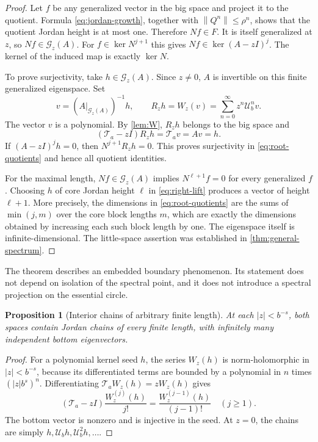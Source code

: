 \documentclass[11pt,a4paper]{article}
\numberwithin{equation}{section}
\newtheorem{proposition}[theorem]{Proposition}
\theoremstyle{definition}
\theoremstyle{remark}
\newcommand{\Ta}{\mathcal T_a}
\newcommand{\Ub}{\mathcal U_b}
\newcommand{\norm}[1]{\left\lVert#1\right\rVert}
\newcommand{\Gg}[2]{\mathcal G_{#1}(#2)}
\begin{document}
\begin{proof}
Let $f$ be any generalized vector in the big space and project it to
the quotient. Formula \eqref{eq:jordan-growth}, together with
$\norm{Q^n}\le\rho^n$, shows that the quotient Jordan height is at
most one. Therefore $Nf\in F$. It is itself generalized at $z$, so
$Nf\in\Gg zA$. For $f\in\ker N^{j+1}$ this gives
$Nf\in\ker(A-zI)^j$. The kernel of the induced map is exactly
$\ker N$.

To prove surjectivity, take $h\in\Gg zA$. Since $z\ne0$, $A$ is
invertible on this finite generalized eigenspace. Set
\begin{equation}
 v=(A|_{\Gg zA})^{-1}h,\qquad
 R_z h=W_z(v)=\sum_{n=0}^\infty z^n\Ub^n v.
 \label{eq:right-lift}
\end{equation}
The vector $v$ is a polynomial. By \cref{lem:W}, $R_zh$ belongs to
the big space and
\begin{equation}
 (\Ta-zI)R_zh=\Ta v=Av=h.
 \label{eq:lift-identity}
\end{equation}
If $(A-zI)^jh=0$, then $N^{j+1}R_zh=0$. This proves surjectivity
in \eqref{eq:root-quotients} and hence all quotient identities.

For the maximal length, $Nf\in\Gg zA$ implies
$N^{\ell+1}f=0$ for every generalized $f$. Choosing $h$ of core Jordan
height $\ell$ in \eqref{eq:right-lift} produces a vector of height
$\ell+1$. More precisely, the dimensions in
\eqref{eq:root-quotients} are the sums of $\min(j,m)$ over the core
block lengths $m$, which are exactly the dimensions obtained by
increasing each such block length by one. The eigenspace itself is
infinite-dimensional. The little-space assertion was established in
\cref{thm:general-spectrum}.
\end{proof}

The theorem describes an embedded boundary phenomenon. Its statement
does not depend on isolation of the spectral point, and it does not
introduce a spectral projection on the essential circle.

\begin{proposition}[Interior chains of arbitrary finite length]
\label{prop:interior-chains}
At each $|z|<b^{-s}$, both spaces contain Jordan chains of every finite
length, with infinitely many independent bottom eigenvectors.
\end{proposition}
\begin{proof}
For a polynomial kernel seed $h$, the series $W_z(h)$ is norm-holomorphic
in $|z|<b^{-s}$, because its differentiated terms are bounded by a
polynomial in $n$ times $(|z|b^s)^n$. Differentiating
$\Ta W_z(h)=zW_z(h)$ gives
\[
 (\Ta-zI)\frac{W_z^{(j)}(h)}{j!}
 =\frac{W_z^{(j-1)}(h)}{(j-1)!}\quad(j\ge1).
\]
The bottom vector is nonzero and is injective in the seed. At $z=0$,
the chains are simply $h,\Ub h,\Ub^2h,\ldots$.
\end{proof}
\end{document}
